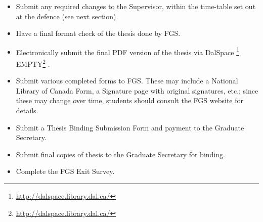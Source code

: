 \documentclass[12pt]{article}
\newcommand\etc{etc.\xspace}
\newcommand{\furl}[2][EMPTY]%
    {\ifthenelse%
        {\equal{#1}{EMPTY}}%
        {\footnote{\footnotesize{\url{#2}}}}%
        {#1\footnote{\footnotesize{\url{#2}}}}%
    }
\newcommand{\supervisor}{Supervisor\xspace}
\newcommand{\GS}{Graduate Secretary\xspace}
\newcommand{\FGS}{FGS\xspace}
\begin{document}
\begin{itemize}
\begin{itemize}
            \item Submit any required changes to the \supervisor, within the
                time-table set out at the defence (see next section).

            \item Have a final format check of the thesis done by \FGS.

            \item Electronically submit the final PDF version of the thesis via
                DalSpace\furl{http://dalspace.library.dal.ca/}.

            \item Submit various completed forms to \FGS. These may include
                a National Library of Canada Form, a Signature page with
                original signatures, \etc; since these may change over time,
                students should consult the FGS website for details.

            \item Submit a Thesis Binding Submission Form and payment to the
                \GS.

            \item Submit final copies of thesis to the \GS for binding.

            \item Complete the \FGS Exit Survey.

        \end{itemize}

\end{itemize}
\end{document}
